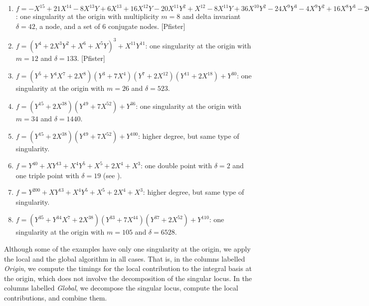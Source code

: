 \documentclass[a4paper,11pt]{amsart}%
\theoremstyle{definition}
\theoremstyle{plain}
\theoremstyle{remark}
\begin{document}
\begin{enumerate}
{\scriptsize \setlength{\leftskip}{-2em} }

\item {\scriptsize $f=-X^{15}+21X^{14}-8X^{13}Y+6X^{13}+16X^{12}%
Y-20X^{11}Y^{2}+X^{12}-8X^{11}Y+36X^{10}Y^{2}-24X^{9}Y^{3}-4X^{9}Y^{2}%
+16X^{8}Y^{3}-26X^{7}Y^{4}+6X^{6}Y^{4}-8X^{5}Y^{5}-4X^{3}Y^{6}+Y^{8}$: one
singularity at the origin with multiplicity $m=8$ and delta invariant
$\delta=42$, a node, and a set of $6$ conjugate nodes. [Pfister]} 

\item {\scriptsize $f=(Y^{4}+2X^{3}Y^{2}+X^{6}+X^{5}Y)^{3}+X^{11}Y^{11}$: one
singularity at the origin with $m=12$ and $\delta=133$. [Pfister]} 

\item {\scriptsize $f=(Y^{5}+Y^{4}X^{7}+2X^{8})(Y^{3}+7X^{4})(Y^{7}%
+2X^{12})(Y^{11}+2X^{18})+Y^{30}$: one singularity at the origin with $m=26$
and $\delta=523$.}

\item {\scriptsize $f=(Y^{15}+2X^{38})(Y^{19}+7X^{52})+Y^{36}$: one
singularity at the origin with $m=34$ and $\delta=1440$.}

\item {\scriptsize $f=(Y^{15}+2X^{38})(Y^{19}+7X^{52})+Y^{100}$: higher
degree, but same type of singularity.}

\item {\scriptsize \label{exam:Hoeij1} $f=Y^{40}+XY^{13}+X^{4}Y^{5}%
+X^{5}+2X^{4}+X^{3}$: one double point with $\delta=2$ and one triple point
with $\delta=19$ (see \cite[Section 6.1]{vanHoeij94}).}

\item {\scriptsize $f=Y^{200}+XY^{13}+X^{4}Y^{5}+X^{5}+2X^{4}+X^{3}$: higher
degree, but same type of singularity.}

\item {\scriptsize $f=(Y^{35}+Y^{34}X^{7}+2X^{38})(Y^{33}+7X^{44}%
)(Y^{37}+2X^{52})+Y^{110}$: one singularity at the origin with $m=105$ and
$\delta=6528$.}
\end{enumerate}

Although some of the examples have only one singularity at the origin, we
apply the local and the global algorithm in all cases. That is, in the columns
labelled \emph{Origin}, we compute the timings for the local contribution to
the integral basis at the origin, which does not involve the decomposition of
the singular locus. In the columns labelled \emph{Global}, we decompose the
singular locus, compute the local contributions, and combine them.
\end{document}
